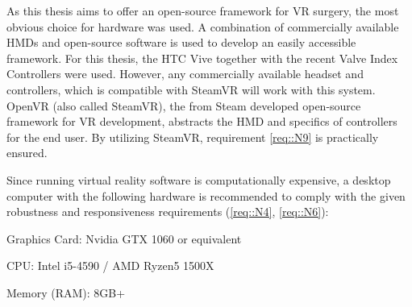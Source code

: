 As this thesis aims to offer an open-source framework for VR surgery, the most obvious choice for hardware was used.
A combination of commercially available HMDs and open-source software is used to develop an easily accessible framework.
For this thesis, the HTC Vive \cite{Vive} together with the recent Valve Index Controllers \cite{ValveIndex} were used.
However, any commercially available headset and controllers, which is compatible with SteamVR will work with this system.
OpenVR \cite{OpenVR} (also called SteamVR), the from Steam developed open-source framework for VR development, abstracts the HMD and specifics of controllers for the end user.
By utilizing SteamVR, requirement \ref{req::N9} is practically ensured.

Since running virtual reality software is computationally expensive, a desktop computer with the following hardware is recommended to comply with the given robustness 
and responsiveness requirements (\ref{req::N4}, \ref{req::N6}):

\begin{compactenum}[label=(\alph*)]
    \item Graphics Card: Nvidia GTX 1060 or equivalent
    \item CPU: Intel i5-4590 / AMD Ryzen5 1500X
    \item Memory (RAM): 8GB+
\end{compactenum}

